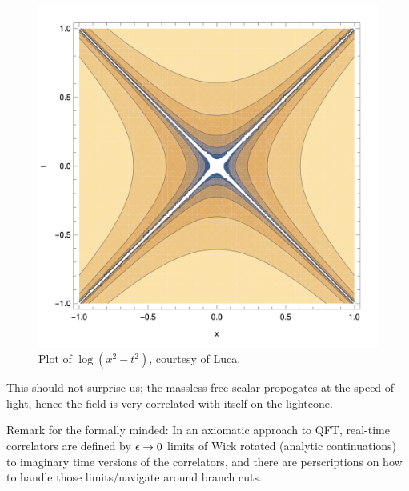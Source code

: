 \begin{figure}[htbp]
    \centering
    \includegraphics[scale=0.5]{Lectures/Figures/logt2x2.png}
    \caption{Plot of $\log(x^2 - t^2)$, courtesy of Luca.}
    \label{fig-logt2x2}
\end{figure}

This should not surprise us; the massless free scalar propogates at the speed of light, hence the field is very correlated with itself on the lightcone.

Remark for the formally minded: In an axiomatic approach to QFT, real-time correlators are defined by $\epsilon \to 0$ limits of Wick rotated (analytic continuations) to imaginary time versions of the correlators, and there are perscriptions on how to handle those limits/navigate around branch cuts.

